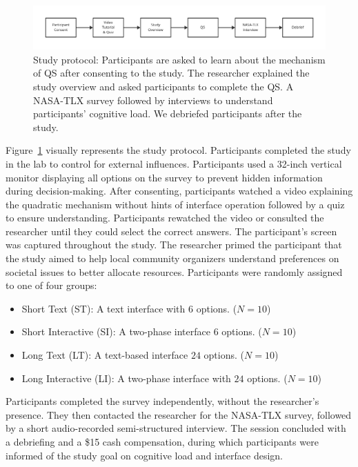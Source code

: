 \begin{figure}[ht!]
    \centering
    \includegraphics[width=1\textwidth]{content/image/study_flow.pdf}
    \caption{Study protocol: Participants are asked to learn about the mechanism of QS after consenting to the study. The researcher explained the study overview and asked participants to complete the QS. A NASA-TLX survey followed by interviews to understand participants' cognitive load. We debriefed participants after the study.}
    \label{fig:studyProtocol}
\end{figure}


Figure~\ref{fig:studyProtocol} visually represents the study protocol. Participants completed the study in the lab to control for external influences. Participants used a 32-inch vertical monitor displaying all options on the survey to prevent hidden information during decision-making. After consenting, participants watched a video explaining the quadratic mechanism without hints of interface operation followed by a quiz to ensure understanding. Participants rewatched the video or consulted the researcher until they could select the correct answers. The participant's screen was captured throughout the study. The researcher primed the participant that the study aimed to help local community organizers understand preferences on societal issues to better allocate resources. Participants were randomly assigned to one of four groups:

\begin{itemize}
    \item Short Text (ST): A text interface with $6$ options. ($N=10$)
    \item Short Interactive (SI): A two-phase interface $6$ options. ($N=10$)
    \item Long Text (LT): A text-based interface $24$ options. ($N=10$)
    \item Long Interactive (LI): A two-phase interface with $24$ options. ($N=10$)
\end{itemize}

Participants completed the survey independently, without the researcher's presence. They then contacted the researcher for the NASA-TLX survey, followed by a short audio-recorded semi-structured interview. The session concluded with a debriefing and a \$15 cash compensation, during which participants were informed of the study goal on cognitive load and interface design.


